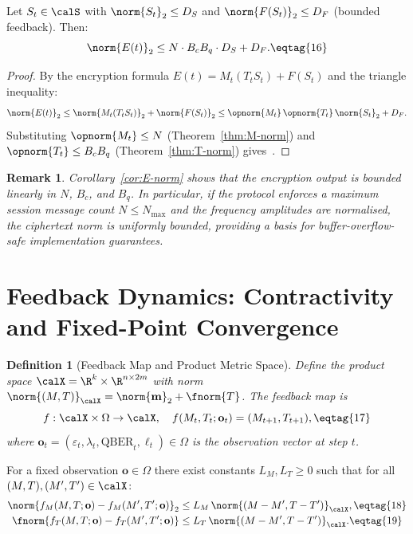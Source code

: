 \documentclass[11pt,letterpaper]{article}
\newtheorem{definition}{Definition}[section]
\newtheorem{remark}{Remark}[section]
\begin{document}
\begin{corollary}\label{cor:E-norm}
Let $S_t \in \calS$ with $\norm{S_t}_2 \leq D_S$ and
$\norm{F(S_t)}_2 \leq D_F$ (bounded feedback). Then:
\[
  \norm{E(t)}_2 \leq N \cdot B_c B_q \cdot D_S + D_F. \eqtag{16}
\]
\end{corollary}

\begin{proof}
By the encryption formula $E(t) = M_t(T_t S_t) + F(S_t)$
and the triangle inequality:
\[
  \norm{E(t)}_2 \leq \norm{M_t(T_t S_t)}_2 + \norm{F(S_t)}_2
  \leq \opnorm{M_t}\,\opnorm{T_t}\,\norm{S_t}_2 + D_F.
\]
Substituting $\opnorm{M_t}\leq N$ (Theorem~\ref{thm:M-norm})
and $\opnorm{T_t}\leq B_cB_q$ (Theorem~\ref{thm:T-norm}) gives~.
\end{proof}

\begin{remark}
Corollary~\ref{cor:E-norm} shows that the encryption output is bounded
linearly in $N$, $B_c$, and $B_q$. In particular, if the protocol
enforces a maximum session message count $N \leq N_{\max}$ and the
frequency amplitudes are normalised, the ciphertext norm is uniformly bounded,
providing a basis for buffer-overflow-safe implementation guarantees.
\end{remark}

\section{Feedback Dynamics: Contractivity and Fixed-Point Convergence}
\label{sec:feedback}

\begin{definition}[Feedback Map and Product Metric Space]\label{def:fb}
Define the product space
$\calX = \R^k \times \R^{n\times 2m}$
with norm
$\norm{(M,T)}_\calX = \norm{\mathbf{m}}_2 + \fnorm{T}$.
The feedback map is
\[
  f:\calX \times \Omega \to \calX,\quad
  f(M_t, T_t; \mathbf{o}_t) = (M_{t+1}, T_{t+1}), \eqtag{17}
\]
where $\mathbf{o}_t = (\varepsilon_t, \lambda_t, \mathrm{QBER}_t, \ell_t) \in \Omega$
is the observation vector at step $t$.
\end{definition}

\begin{assumption}\label{asm:lip}
For a fixed observation $\mathbf{o} \in \Omega$ there exist constants
$L_M, L_T \geq 0$ such that for all $(M,T),(M',T') \in \calX$:
\begin{align}
  \norm{f_M(M,T;\mathbf{o}) - f_M(M',T';\mathbf{o})}_2
    &\leq L_M\,\norm{(M-M',T-T')}_\calX, \eqtag{18}\\
  \fnorm{f_T(M,T;\mathbf{o}) - f_T(M',T';\mathbf{o})}
    &\leq L_T\,\norm{(M-M',T-T')}_\calX. \eqtag{19}
\end{align}
\end{assumption}
\end{document}
